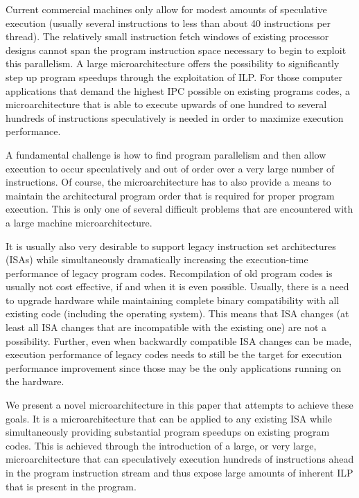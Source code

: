 \documentclass[10pt,dvips]{article}
\begin{document}
Current commercial machines only allow for modest
amounts of speculative execution (usually several instructions to 
less than about 40 instructions per thread).
The relatively small
instruction fetch windows of existing processor designs cannot span
the program instruction space necessary to begin to exploit this
parallelism.  
A large microarchitecture offers the
possibility to significantly step up program speedups through 
the exploitation of ILP.
For those computer applications that demand the
highest IPC possible on existing programs codes, a microarchitecture
that is able to execute upwards of one hundred to
several hundreds of instructions speculatively is needed in order to 
maximize execution performance.  

A fundamental challenge 
is how to find program parallelism and then allow execution to occur
speculatively and out of order over a very large number of instructions.
Of course, the microarchitecture has to also provide a means
to maintain the architectural program order that
is required for proper program execution.
This is only one of several difficult problems that are
encountered with a large machine microarchitecture.

It is usually also very desirable to support legacy instruction
set architectures (ISAs) while simultaneously dramatically
increasing the execution-time performance of legacy
program codes.  Recompilation of old program
codes is usually not cost effective, if and when it is even possible.
Usually, there is a need to upgrade hardware while maintaining
complete binary compatibility with all existing
code (including the operating system).
This means that ISA changes (at least all
ISA changes that are incompatible with the existing one) are
not a possibility.  Further, even when backwardly compatible
ISA changes can be made, execution performance of legacy
codes needs to still be the target for execution performance 
improvement since 
those may be the only applications running on the hardware.

We present a novel microarchitecture in this paper that
attempts to achieve these goals.  It is a microarchitecture that can
be applied to any existing ISA while simultaneously providing
substantial program speedups on existing program codes.
This is achieved through the introduction of a large, or very
large, microarchitecture that can speculatively execution hundreds
of instructions ahead in the program instruction stream and
thus expose large amounts of inherent ILP that is present in
the program.
\end{document}
